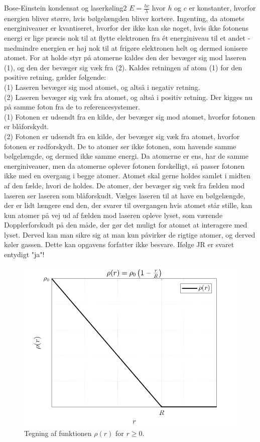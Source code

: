 %
%
\begin{opgave}{Bose-Einstein kondensat og laserkøling}{2}
\opg $E = \frac{hc}{\lambda}$ hvor $h$ og $c$ er konstanter, hvorfor energien bliver større, hvis bølgelængden bliver kortere.
\opg Ingenting, da atomets energiniveauer er kvantiseret, hvorfor der ikke kan ske noget, hvis ikke fotonens energi er lige præcis nok til at flytte elektronen fra ét energiniveau til et andet - medmindre energien er høj nok til at frigøre elektronen helt og dermed ionisere atomet.
\opg For at holde styr på atomerne kaldes den der bevæger sig mod laseren (1), og den der bevæger sig væk fra (2). Kaldes retningen af atom (1) for den positive retning, gælder følgende: \\
(1) Laseren bevæger sig mod atomet, og altså i negativ  retning. \\
(2) Laseren bevæger sig væk fra atomet, og altså i positiv retning.
\opg Der kigges nu på samme foton fra de to referencesystemer. \\
(1) Fotonen er udsendt fra en kilde, der bevæger sig mod atomet, hvorfor fotonen er blåforskydt. \\
(2) Fotonen er udsendt fra en kilde, der bevæger sig væk fra atomet, hvorfor fotonen er rødforskydt.
\opg De to atomer ser ikke fotonen, som havende samme bølgelængde, og dermed ikke samme energi. Da atomerne er ens, har de samme energiniveauer, men da atomerne oplever fotonen forskelligt, så passer fotonen ikke med en overgang i begge atomer.
\opg Atomet skal gerne holdes samlet i midten af den fælde, hvori de holdes. De atomer, der bevæger sig væk fra fælden mod laseren ser laseren som blåforskudt. Vælges laseren til at have en bølgelængde, der er lidt længere end den, der svarer til overgangen hvis atomet står stille, kan kun atomer på vej ud af fælden mod laseren opleve lyset, som værende Dopplerforskudt på den måde, der gør det muligt for atomet at interagere med lyset. Derved kan man sikre sig at man kun påvirker de rigtige atomer, og derved køler gassen.
\opg Dette kan opgavens forfatter ikke besvare. Ifølge JR er svaret entydigt "ja"!
\end{opgave}
%
%
\begin{figure}
	\centering
	\includegraphics[width=.6\textwidth]{Astrofysik/billeder/PlanetMasse.png}
	\caption{Tegning af funktionen $\rho(r)$ for $r\geq0$.}
	\label{fig:PlanetMasse}
\end{figure}
